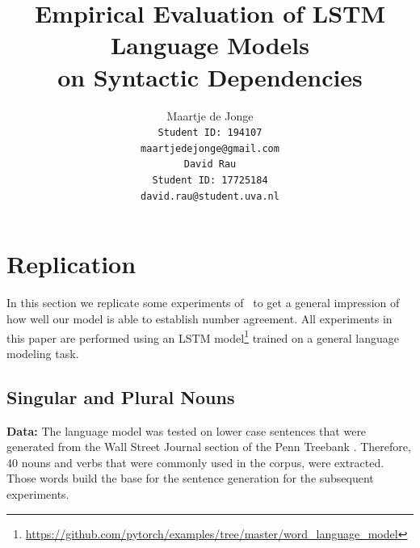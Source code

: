 \documentclass[11pt,a4paper]{article}
\title{Empirical Evaluation of LSTM Language Models \protect\\ \bigskip
on Syntactic Dependencies}
\author{
Maartje de Jonge\\
\tt Student ID: 194107\\
{\tt maartjedejonge@gmail.com} \\\And
David Rau \\
\tt Student ID: 17725184\\
{\tt david.rau@student.uva.nl} \\}
\date{}
\begin{document}
\maketitle














\section{Replication}
\label{replication}

In this section we replicate some experiments of~\citep{Linzen2016} to get a general impression of how well our model is able to establish number agreement.
All experiments in this paper are performed using an LSTM model\footnote{
\url{https://github.com/pytorch/examples/tree/master/word_language_model}
} trained on a general language modeling task.

\subsection{Singular and Plural Nouns}

\textbf{Data:} 
The language model was tested on lower case sentences that were generated from the Wall Street Journal section of the Penn Treebank \citep{Marcus1993}. Therefore, 40 nouns and verbs that were commonly used in the corpus, were extracted. Those words build the base for the sentence generation for the subsequent experiments. 
\end{document}
